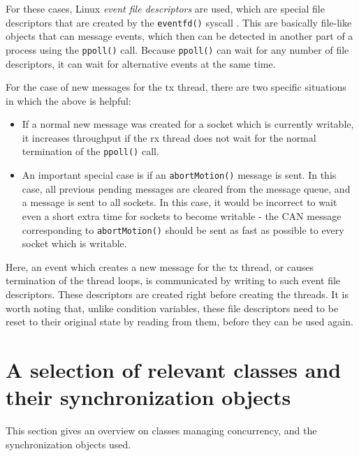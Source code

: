 \documentclass[fontsize=12,a4paper]{scrartcl}
\begin{document}
For these cases, Linux \emph{event file descriptors} are used, which
are special file descriptors that are created by the
\texttt{eventfd()} syscall \cite{man:eventfd}.  This are basically
file-like objects that can message events, which then can be detected
in another part of a process using the \texttt{ppoll()} call.  Because
\texttt{ppoll()} can wait for any number of file descriptors, it can
wait for alternative events at the same time.

For the case of new messages for the tx thread, there are two specific
situations in which the above is helpful:

\begin{itemize}
\item If a normal new message was created for a socket which is
  currently writable, it increases throughput if the rx thread does
  not wait for the normal termination of the \texttt{ppoll()} call.
  
\item An important special case is if an \texttt{abortMotion()}
  message is sent. In this case, all previous pending messages are
  cleared from the message queue, and a message is sent to all
  sockets. In this case, it would be incorrect to wait even a short
  extra time for sockets to become writable - the CAN message
  corresponding to \texttt{abortMotion()} should be sent as fast as
  possible to every socket which is writable.
  
\end{itemize}

Here, an event which creates a new message for the tx thread, or
causes termination of the thread loops, is communicated by writing to
such event file descriptors. These descriptors are created right
before creating the threads. It is worth noting that, unlike condition
variables, these file descriptors need to be reset to their original
state by reading from them, before they can be used again.

\section{A selection of relevant classes and their synchronization objects}

This section gives an overview on classes managing concurrency, and
the synchronization objects used.
\end{document}
